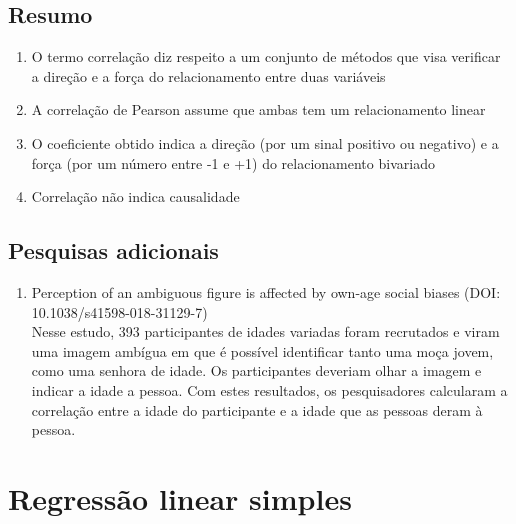\documentclass[
]{book}
\providecommand{\tightlist}{%
  \setlength{\itemsep}{0pt}\setlength{\parskip}{0pt}}
\begin{document}
\hypertarget{resumo-11}{%
\section{Resumo}\label{resumo-11}}

\begin{explore}

\begin{enumerate}
\def\labelenumi{\arabic{enumi}.}
\tightlist
\item
  O termo correlação diz respeito a um conjunto de métodos que visa verificar a direção e a força do relacionamento entre duas variáveis\\
\item
  A correlação de Pearson assume que ambas tem um relacionamento linear\\
\item
  O coeficiente obtido indica a direção (por um sinal positivo ou negativo) e a força (por um número entre -1 e +1) do relacionamento bivariado\\
\item
  Correlação não indica causalidade\\
\end{enumerate}

\end{explore}

\hypertarget{pesquisas-adicionais-5}{%
\section{Pesquisas adicionais}\label{pesquisas-adicionais-5}}

\begin{enumerate}
\def\labelenumi{\arabic{enumi}.}
\tightlist
\item
  Perception of an ambiguous figure is affected by own-age social biases (DOI: 10.1038/s41598-018-31129-7)\\
  Nesse estudo, 393 participantes de idades variadas foram recrutados e viram uma imagem ambígua em que é possível identificar tanto uma moça jovem, como uma senhora de idade. Os participantes deveriam olhar a imagem e indicar a idade a pessoa. Com estes resultados, os pesquisadores calcularam a correlação entre a idade do participante e a idade que as pessoas deram à pessoa.
\end{enumerate}

\hypertarget{regressuxe3o-linear-simples}{%
\chapter{Regressão linear simples}\label{regressuxe3o-linear-simples}}
\end{document}
